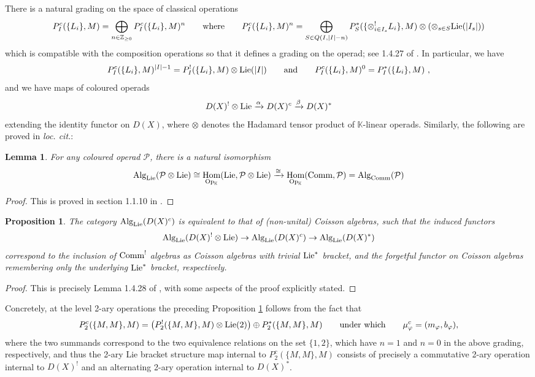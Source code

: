 \documentclass[11pt]{amsart}
\numberwithin{equation}{section}
\newtheorem{lemma}[theo]{Lemma}
\newtheorem{prop}[theo]{Proposition}
\theoremstyle{definition}
\newcommand{\bb}{\mathbb}
\newcommand{\mc}{\mathcal}
\DeclareMathOperator{\Hom}{Hom}
\newcommand{\K}{{\bb K}}
\newcommand{\Alg}{{\textup{Alg}}}
\newcommand{\Comm}{{\textup{Comm}}}
\newcommand{\Lie}{{\textup{Lie}}}
\newcommand{\Op}{{\textup{Op}}}
\newcommand{\0}{{\textbf{0}}}
\newcommand{\DD}{{D}}
\newcommand{\Z}{\bb Z}
\def \Op{\mathrm{Op}}
\begin{document}
There is a natural grading on the space of classical operations
\begin{equation}\label{BDgreqn}
	 P_I^c(\{ L_i\},M) = \bigoplus_{n\in \Z_{\geq 0}}  P_I^c(\{ L_i\},M)^n \qquad\text{where}\qquad    P_I^c(\{ L_i\},M)^n = \bigoplus_{S\in Q(I,|I|-n)} P_S^*(\{ \otimes^!_{i\in I_s} L_i\},M)\otimes ( \otimes_{s\in S} \Lie(|I_s|))  
\end{equation}
which is compatible with the composition operations so that it defines a grading on the operad; see 1.4.27 of \cite{BD1}.  In particular, we have
\[ P_I^c(\{ L_i\},M)^{|I|-1} = P^!_I(\{L_i\},M)\otimes \Lie(|I|) \qquad \text{and}\qquad  P_I^c(\{ L_i\},M)^0= P^*_I(\{L_i\},M) \ , \]
and we have maps of coloured operads
\begin{equation}\label{alphabetaeqn}
	\DD(X)^!\otimes \Lie \xrightarrow{\alpha} \DD(X)^c \xrightarrow{\beta} \DD(X)^*  
\end{equation}
extending the identity functor on $\DD(X)$, where $\otimes$ denotes the Hadamard tensor product of $\K$-linear operads. Similarly, the following are proved in \emph{loc. cit.}:
\begin{lemma} For any coloured operad $\mc P$, there is a natural isomorphism
	\[ \Alg_{\Lie}(\mc P\otimes \Lie) \cong \Hom_{\Op_\K}( \Lie, \mc P\otimes \Lie) \xrightarrow{\cong}    \Hom_{\Op_\K}( \Comm, \mc P)=\Alg_{\Comm}(\mc P)\]
\end{lemma}
\begin{proof} This is proved in section 1.1.10 in \cite{BD1}.
\end{proof}

\begin{prop}\label{CoisLieprop} The category $\Alg_{\Lie}(\DD(X)^c)$ is equivalent to that of (non-unital) Coisson algebras, such that the induced functors
\[ \Alg_{\Lie}(\DD(X)^! \otimes \Lie) \to  \Alg_{\Lie}(\DD(X)^c) \to  \Alg_{\Lie}(\DD(X)^*) \]
correspond to the inclusion of $\Comm^!$ algebras as Coisson algebras with trivial $\Lie^*$ bracket, and the forgetful functor on Coisson algebras remembering only the underlying $\Lie^*$ bracket, respectively.
\end{prop}
\begin{proof}
This is precisely Lemma 1.4.28 of \cite{BD1}, with some aspects of the proof explicitly stated. 
\end{proof}
Concretely, at the level 2-ary operations the preceding Proposition \ref{CoisLieprop} follows from the fact that
\begin{equation}\label{cl2arydecompeqn}
	 P_2^c(\{M,M\},M) =\left( P_2^!(\{M,M\},M)\otimes \Lie(2)\right)  \oplus P_2^*(\{M,M\},M) \qquad \text{under which}\qquad \mu_\varphi^c= (m_\varphi, b_\varphi) , 
\end{equation}
where the two summands correspond to the two equivalence relations on the set $\{1,2\}$, which have $n=1$ and $n=0$ in the above grading, respectively, and thus the 2-ary Lie bracket structure map internal to $P_2^c(\{M,M\},M)$ consists of precisely a commutative 2-ary operation internal to $\DD(X)^!$ and an alternating 2-ary operation internal to $\DD(X)^*$.
\end{document}
